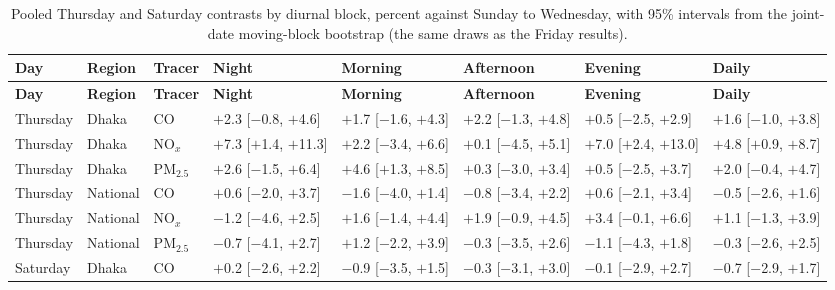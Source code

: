 \begingroup\scriptsize
\begin{longtable}{L{1.6cm} L{1.4cm} L{1.1cm} C{2.1cm} C{2.1cm} C{2.1cm} C{2.1cm} C{2.1cm}}
\caption{Pooled Thursday and Saturday contrasts by diurnal block, percent against Sunday to Wednesday, with 95\% intervals from the joint-date moving-block bootstrap (the same draws as the Friday results).}\label{tab:s-thusat}\\
\toprule
\textbf{Day} & \textbf{Region} & \textbf{Tracer} & \textbf{Night} & \textbf{Morning} & \textbf{Afternoon} & \textbf{Evening} & \textbf{Daily} \\
\midrule\endfirsthead
\toprule
\textbf{Day} & \textbf{Region} & \textbf{Tracer} & \textbf{Night} & \textbf{Morning} & \textbf{Afternoon} & \textbf{Evening} & \textbf{Daily} \\
\midrule\endhead
\bottomrule\endfoot
Thursday & Dhaka & CO & $+$2.3 {\scriptsize[$-$0.8, $+$4.6]} & $+$1.7 {\scriptsize[$-$1.6, $+$4.3]} & $+$2.2 {\scriptsize[$-$1.3, $+$4.8]} & $+$0.5 {\scriptsize[$-$2.5, $+$2.9]} & $+$1.6 {\scriptsize[$-$1.0, $+$3.8]} \\
Thursday & Dhaka & NO$_x$ & $+$7.3 {\scriptsize[$+$1.4, $+$11.3]} & $+$2.2 {\scriptsize[$-$3.4, $+$6.6]} & $+$0.1 {\scriptsize[$-$4.5, $+$5.1]} & $+$7.0 {\scriptsize[$+$2.4, $+$13.0]} & $+$4.8 {\scriptsize[$+$0.9, $+$8.7]} \\
Thursday & Dhaka & PM$_{2.5}$ & $+$2.6 {\scriptsize[$-$1.5, $+$6.4]} & $+$4.6 {\scriptsize[$+$1.3, $+$8.5]} & $+$0.3 {\scriptsize[$-$3.0, $+$3.4]} & $+$0.5 {\scriptsize[$-$2.5, $+$3.7]} & $+$2.0 {\scriptsize[$-$0.4, $+$4.7]} \\
Thursday & National & CO & $+$0.6 {\scriptsize[$-$2.0, $+$3.7]} & $-$1.6 {\scriptsize[$-$4.0, $+$1.4]} & $-$0.8 {\scriptsize[$-$3.4, $+$2.2]} & $+$0.6 {\scriptsize[$-$2.1, $+$3.4]} & $-$0.5 {\scriptsize[$-$2.6, $+$1.6]} \\
Thursday & National & NO$_x$ & $-$1.2 {\scriptsize[$-$4.6, $+$2.5]} & $+$1.6 {\scriptsize[$-$1.4, $+$4.4]} & $+$1.9 {\scriptsize[$-$0.9, $+$4.5]} & $+$3.4 {\scriptsize[$-$0.1, $+$6.6]} & $+$1.1 {\scriptsize[$-$1.3, $+$3.9]} \\
Thursday & National & PM$_{2.5}$ & $-$0.7 {\scriptsize[$-$4.1, $+$2.7]} & $+$1.2 {\scriptsize[$-$2.2, $+$3.9]} & $-$0.3 {\scriptsize[$-$3.5, $+$2.6]} & $-$1.1 {\scriptsize[$-$4.3, $+$1.8]} & $-$0.3 {\scriptsize[$-$2.6, $+$2.5]} \\
Saturday & Dhaka & CO & $+$0.2 {\scriptsize[$-$2.6, $+$2.2]} & $-$0.9 {\scriptsize[$-$3.5, $+$1.5]} & $-$0.3 {\scriptsize[$-$3.1, $+$3.0]} & $-$0.1 {\scriptsize[$-$2.9, $+$2.7]} & $-$0.7 {\scriptsize[$-$2.9, $+$1.7]} \\

\end{longtable}
